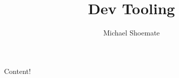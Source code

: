 \documentclass[11pt,a4paper]{article}
\title{Dev Tooling}
\author{Michael Shoemate}
\begin{document}
\maketitle

Content!
\end{document}
